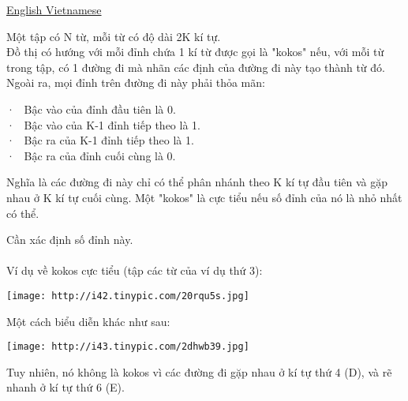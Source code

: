 \href{/problems/show/MKOKOS/en/}{       English      }\href{/problems/show/MKOKOS/vn/}{       Vietnamese      }



   Một tập có N từ, mỗi từ có độ dài 2K kí tự.   
\\   Đồ thị có hướng với mỗi đỉnh chứa 1 kí từ được gọi là "kokos" nếu, với mỗi từ trong tập, có 1 đường đi mà nhãn các định của đường đi này tạo thành từ đó. Ngoài ra, mọi đỉnh trên đường đi này phải thỏa mãn:  

   ·  Bậc vào của đỉnh đầu tiên là 0.   
\\   ·  Bậc vào của K-1 đỉnh tiếp theo là 1.   
\\   ·  Bậc ra của K-1 đỉnh tiếp theo là 1.   
\\   ·  Bậc ra của đỉnh cuối cùng là 0.  

   Nghĩa là các đường đi này chỉ có thể phân nhánh theo K kí tự đầu tiên và gặp nhau ở K kí tự cuối cùng. Một "kokos" là cực tiểu nếu số đỉnh của nó là nhỏ nhất có thể.  

   Cần xác định số đỉnh này.   
\\
\\   Ví dụ về kokos cực tiểu (tập các từ của ví dụ thứ 3):  


\texttt{[image: http://i42.tinypic.com/20rqu5s.jpg]}

   Một cách biểu diễn khác như sau:  


\texttt{[image: http://i43.tinypic.com/2dhwb39.jpg]}

   Tuy nhiên, nó không là kokos vì các đường đi gặp nhau ở kí tự thứ 4 (D), và rẽ nhanh ở kí tự thứ 6 (E).